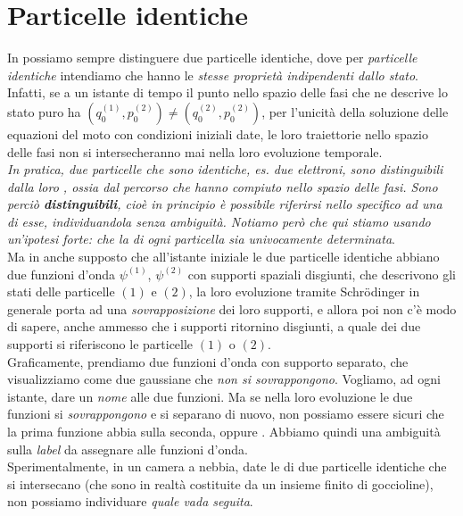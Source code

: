 \documentclass[../../FisicaTeorica.tex]{subfiles}
\begin{document}
\section{Particelle identiche}
In \MC possiamo sempre distinguere due particelle identiche, dove per \textit{particelle identiche} intendiamo che hanno le \textit{stesse proprietà indipendenti dallo stato}.\\
Infatti, se a un istante di tempo il punto nello spazio delle fasi che ne descrive lo stato puro ha $(q_0^{(1)}, p_0^{(2)}) \neq (q_0^{(2)},p_0^{(2)})$, per l'unicità della soluzione delle equazioni del moto con condizioni iniziali date, le loro traiettorie nello spazio delle fasi non si intersecheranno mai nella loro evoluzione temporale.\\
\textit{In pratica, due particelle che sono identiche, es. due elettroni, sono distinguibili dalla loro , ossia dal percorso che hanno compiuto nello spazio delle fasi. Sono perciò \textbf{distinguibili}, cioè in principio è possibile riferirsi nello specifico ad una di esse, individuandola senza ambiguità. Notiamo però che qui stiamo usando un'ipotesi forte: che la  di ogni particella sia univocamente determinata}.\\
Ma in \MQ anche supposto che all'istante iniziale le due particelle identiche abbiano due funzioni d'onda $\psi^{(1)}$, $\psi^{(2)}$ con supporti spaziali disgiunti, che descrivono gli stati delle particelle $(1)$ e $(2)$, la loro evoluzione tramite Schr\"odinger in generale porta ad una \textit{sovrapposizione} dei loro supporti, e allora poi non c'è modo di sapere, anche ammesso che i supporti ritornino disgiunti, a quale dei due supporti si riferiscono le particelle $(1)$ o $(2)$.\\

Graficamente, prendiamo due funzioni d'onda con supporto separato, che visualizziamo come due gaussiane che \textit{non si sovrappongono}. Vogliamo, ad ogni istante, dare un \textit{nome} alle due funzioni. Ma se nella loro evoluzione le due funzioni si \textit{sovrappongono} e si separano di nuovo, non possiamo essere sicuri che la prima funzione abbia  sulla seconda, oppure . Abbiamo quindi una ambiguità sulla \textit{label} da assegnare alle funzioni d'onda.\\

Sperimentalmente, in un camera a nebbia, date le  di due particelle identiche che si intersecano (che sono in realtà costituite da un insieme finito di goccioline), non possiamo individuare \textit{quale  vada seguita}.\\
\end{document}

